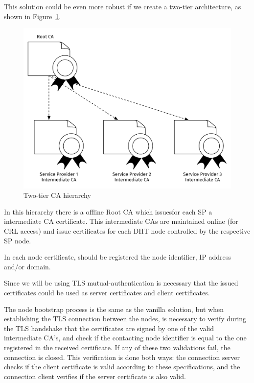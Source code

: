 This solution could be even more robust if we create a two-tier architecture, as shown in Figure~\ref{fig:ca-hierarchy}.

\begin{figure}[htb]
  \centering
  \includegraphics[scale=0.5]{Figures/architecture-ca-hierarchy.pdf}
  \caption{Two-tier \acl{CA} hierarchy}
\label{fig:ca-hierarchy}
\end{figure}

In this hierarchy there is a offline Root CA which issuesfor each \ac{SP} a intermediate CA certificate.
This intermediate CAs are maintained online (for \ac{CRL} access) and issue certificates for each DHT node controlled by the respective \ac{SP} node.

In each node certificate, should be registered the node identifier, IP address and/or domain.

Since we will be using TLS mutual-authentication is necessary that the issued certificates could be used as server certificates and client certificates.

The node bootstrap process is the same as the vanilla solution, but when establishing the TLS connection between the nodes, is necessary to verify during the TLS handshake that the certificates are signed by one of the valid intermediate CA's, and check if the contacting node identifier is equal to the one registered in the received certificate.
If any of these two validations fail, the connection is closed.
This verification is done both ways: the connection server checks if the client certificate is valid according to these specifications, and the connection client verifies if the server certificate is also valid.

